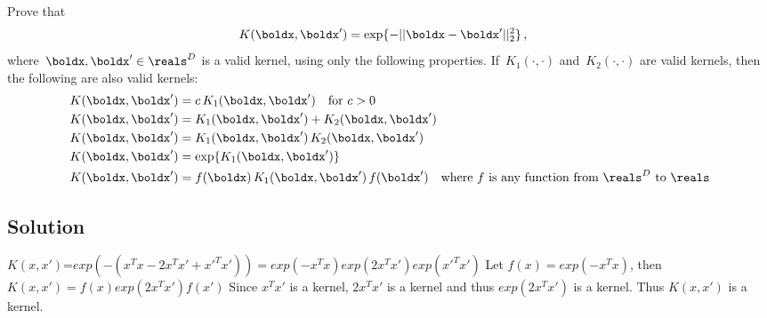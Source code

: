 \documentclass[submit]{harvardml}
\begin{document}
\newpage
\begin{problem}
Prove that
\begin{align*}
	K(\boldx, \boldx') &= \exp\{ -||\boldx - \boldx'||^2_2 \}\,,
\end{align*}
where~$\boldx,\boldx'\in\reals^D$ is a valid kernel, using only the following
properties.  If~$K_1(\cdot,\cdot)$ and~$K_2(\cdot,\cdot)$ are valid kernels,
then the following are also valid kernels:
\begin{align*}
	K(\boldx, \boldx') &= c\,K_1(\boldx, \boldx') \quad \text{for $c>0$}\\
	K(\boldx, \boldx') &= K_1(\boldx, \boldx') + K_2(\boldx, \boldx')\\
	K(\boldx, \boldx') &= K_1(\boldx, \boldx')\,K_2(\boldx, \boldx')\\
	K(\boldx, \boldx') &= \exp\{ K_1(\boldx, \boldx') \}\\
  K(\boldx, \boldx') &= f(\boldx)\,K_1(\boldx, \boldx')\,f(\boldx') \quad
  \text{where $f$ is any function from~$\reals^D$ to $\reals$}
\end{align*}
 \end{problem}
\subsection*{Solution}
$K(x,x')$=$exp(-(x^Tx-2x^Tx'+x'^Tx'))=exp(-x^Tx)exp(2x^Tx')exp(x'^Tx')$
Let $f(x)=exp(-x^Tx)$, then $K(x,x')=f(x)exp(2x^Tx')f(x')$
Since $x^Tx'$ is a kernel, $2x^Tx'$ is a kernel and thus $exp(2x^Tx')$ is a kernel. Thus $K(x,x')$ is a kernel.
\end{document}
